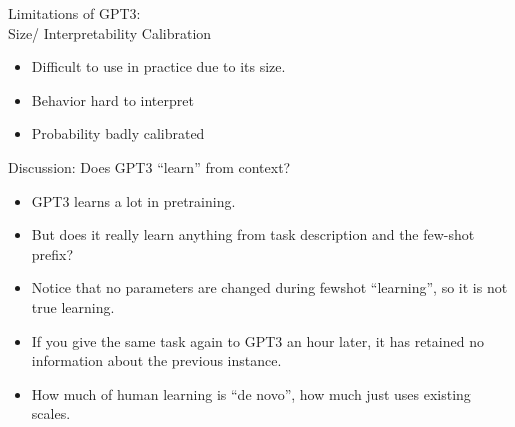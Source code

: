 
\begin{vbframe}{Limitations of GPT3:\\ Size/ Interpretability Calibration}

\vfill

  \begin{itemize}
\item Difficult to use in practice due to its size.
    \item Behavior hard to interpret
    \item Probability badly calibrated

    \end{itemize}

\vfill

\end{vbframe}



\begin{vbframe}{Discussion: Does GPT3 ``learn'' from context?}

\vfill

  \begin{itemize}
\item GPT3 learns a lot in pretraining.
    \item But does it really learn anything from
task description and    the few-shot prefix?
    \item Notice that no parameters are changed during
    fewshot ``learning'', so it is not true learning.
    \item If you give the same task again to GPT3 an
    hour later, it has retained no information about the
    previous instance.
    \item How much of human learning is ``de novo'',
    how much just uses existing scales.

    \end{itemize}

\vfill

\end{vbframe}


\endlecture

